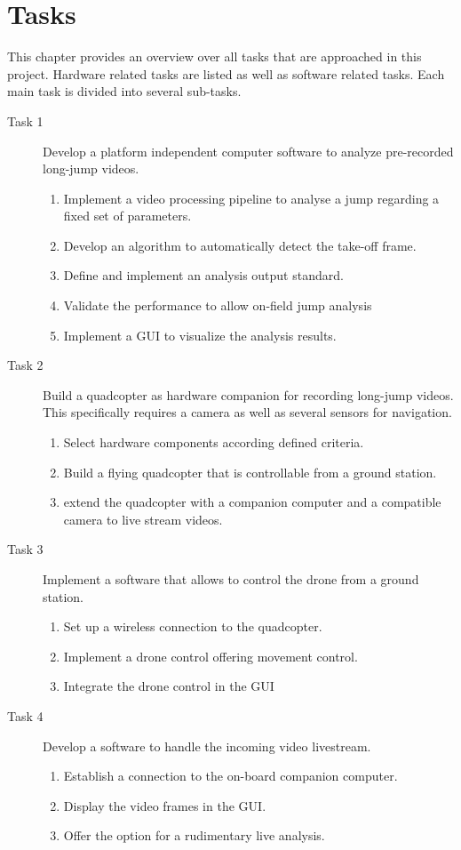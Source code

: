 \graphicspath{{./figures/}}
\chapter{Tasks}
This chapter provides an overview over all tasks that are approached in this
project.
Hardware related tasks are listed as well as software related tasks.
Each main task is divided into several sub-tasks.

\begin{description}
    \item[Task 1] Develop a platform independent computer software to analyze 
    pre-recorded long-jump videos.
    \begin{enumerate}
        \item Implement a video processing pipeline to analyse a jump regarding 
        a fixed set of parameters.
        \item Develop an algorithm to automatically detect the take-off frame.
        \item Define and implement an analysis output standard.
        \item Validate the performance to allow on-field jump analysis 
        \item Implement a \acs*{GUI} to visualize the analysis results.
    \end{enumerate}
    \item[Task 2] Build a quadcopter as hardware companion for recording 
    long-jump videos. This specifically requires a camera as well as several
    sensors for navigation.
    \begin{enumerate}
        \item Select hardware components according defined criteria.
        \item Build a flying quadcopter that is controllable from a ground
        station.
        \item extend the quadcopter with a companion computer and a compatible
        camera to live stream videos.
    \end{enumerate}
    \item[Task 3] Implement a software that allows to control the drone from a
    ground station.
    \begin{enumerate}
        \item Set up a wireless connection to the quadcopter.
        \item Implement a drone control offering movement control.
        \item Integrate the drone control in the \acs*{GUI}
    \end{enumerate}
    \item[Task 4] Develop a software to handle the incoming video livestream.
    \begin{enumerate}
        \item Establish a connection to the on-board companion computer.
        \item Display the video frames in the \acs*{GUI}.
        \item Offer the option for a rudimentary live analysis.
    \end{enumerate}
\end{description}
